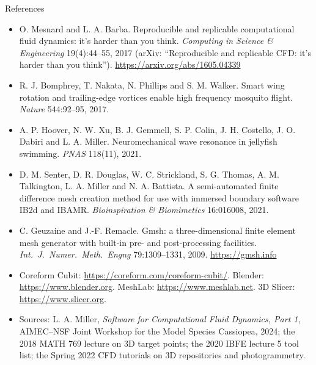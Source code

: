 \documentclass[aspectratio=169,11pt]{beamer}
\begin{document}
\begin{frame}{References}
\scriptsize
\begin{itemize}
  \item O. Mesnard and L. A. Barba. Reproducible and replicable computational fluid dynamics: it's harder than you think. \emph{Computing in Science \& Engineering} 19(4):44--55, 2017 (arXiv: ``Reproducible and replicable CFD: it's harder than you think''). \url{https://arxiv.org/abs/1605.04339}
  \item R. J. Bomphrey, T. Nakata, N. Phillips and S. M. Walker. Smart wing rotation and trailing-edge vortices enable high frequency mosquito flight. \emph{Nature} 544:92--95, 2017.
  \item A. P. Hoover, N. W. Xu, B. J. Gemmell, S. P. Colin, J. H. Costello, J. O. Dabiri and L. A. Miller. Neuromechanical wave resonance in jellyfish swimming. \emph{PNAS} 118(11), 2021.
  \item D. M. Senter, D. R. Douglas, W. C. Strickland, S. G. Thomas, A. M. Talkington, L. A. Miller and N. A. Battista. A semi-automated finite difference mesh creation method for use with immersed boundary software IB2d and IBAMR. \emph{Bioinspiration \& Biomimetics} 16:016008, 2021.
  \item C. Geuzaine and J.-F. Remacle. Gmsh: a three-dimensional finite element mesh generator with built-in pre- and post-processing facilities. \emph{Int.\ J.\ Numer.\ Meth.\ Engng} 79:1309--1331, 2009. \url{https://gmsh.info}
  \item Coreform Cubit: \url{https://coreform.com/coreform-cubit/}. Blender: \url{https://www.blender.org}. MeshLab: \url{https://www.meshlab.net}. 3D Slicer: \url{https://www.slicer.org}.
  \item Sources: L. A. Miller, \emph{Software for Computational Fluid Dynamics, Part 1}, AIMEC--NSF Joint Workshop for the Model Species Cassiopea, 2024; the 2018 MATH 769 lecture on 3D target points; the 2020 IBFE lecture 5 tool list; the Spring 2022 CFD tutorials on 3D repositories and photogrammetry.
\end{itemize}
\end{frame}
\end{document}
